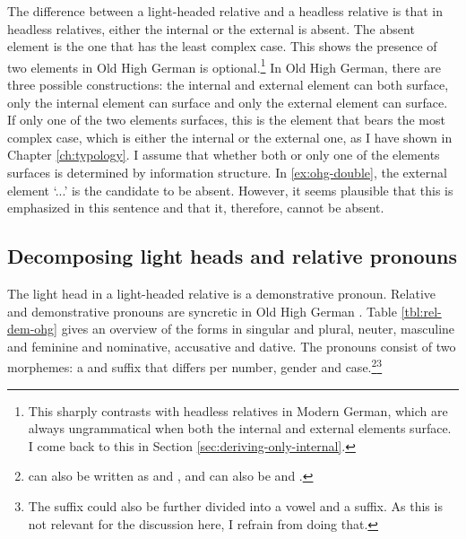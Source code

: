  The difference between a light-headed relative and a headless relative is that in headless relatives, either the internal or the external is absent. The absent element is the one that has the least complex case. This shows the presence of two elements in Old High German is optional.\footnote{
 This sharply contrasts with headless relatives in Modern German, which are always ungrammatical when both the internal and external elements surface. I come back to this in Section \ref{sec:deriving-only-internal}.
 }
 In Old High German, there are three possible constructions: the internal and external element can both surface, only the internal element can surface and only the external element can surface. If only one of the two elements surfaces, this is the element that bears the most complex case, which is either the internal or the external one, as I have shown in Chapter \ref{ch:typology}. I assume that whether both or only one of the elements surfaces is determined by information structure. In \ref{ex:ohg-double}, the external element  `...' is the candidate to be absent. However, it seems plausible that this is emphasized in this sentence and that it, therefore, cannot be absent.


\subsection{Decomposing light heads and relative pronouns}

 The light head in a light-headed relative is a demonstrative pronoun. Relative and demonstrative pronouns are syncretic in Old High German . Table \ref{tbl:rel-dem-ohg} gives an overview of the forms in singular and plural, neuter, masculine and feminine and nominative, accusative and dative. The pronouns consist of two morphemes: a  and suffix that differs per number, gender and case.\footnote{
  can also be written as  and ,  and  can also be  and  .
 }\footnote{
 The suffix could also be further divided into a vowel and a suffix. As this is not relevant for the discussion here, I refrain from doing that.
 }

